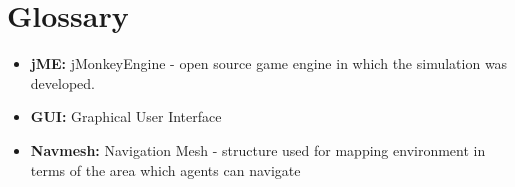 \section{Glossary}
\begin{itemize}
\item{\textbf{jME:} jMonkeyEngine - open source game engine in which the simulation was developed.}
\item{\textbf{GUI:} Graphical User Interface}
\item{\textbf{Navmesh:} Navigation Mesh - structure used for mapping environment in terms of the area which agents can navigate}
\end{itemize}

